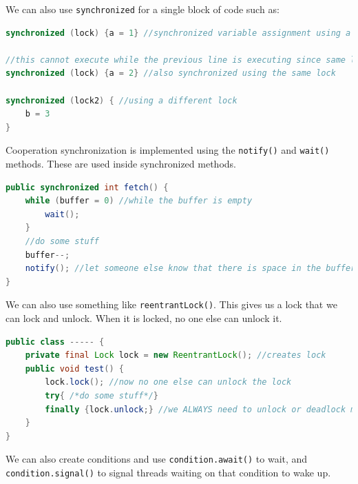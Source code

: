\documentclass[12pt,letterpaper]{article} \usepackage{amsmath} \usepackage{graphicx} \usepackage[margin=1in]{geometry} \usepackage{longtable}  \usepackage{amssymb}
\begin{document}
	We can also use \verb*|synchronized| for a single block of code such as:
	\begin{lstlisting}[language=java]
synchronized (lock) {a = 1} //synchronized variable assignment using a lock

//this cannot execute while the previous line is executing since same lock
synchronized (lock) {a = 2} //also synchronized using the same lock 

synchronized (lock2) { //using a different lock
	b = 3
}
	\end{lstlisting}

	Cooperation synchronization is implemented using the \verb*|notify()| and \verb*|wait()| methods. These are used inside synchronized methods. 
	\begin{lstlisting}[language=java]
public synchronized int fetch() {
	while (buffer = 0) //while the buffer is empty
		wait();
	}
	//do some stuff 
	buffer--;
	notify(); //let someone else know that there is space in the buffer to add to
}
	\end{lstlisting}

	We can also use something like \verb*|reentrantLock()|. This gives us a lock that we can lock and unlock. When it is locked, no one else can unlock it. 
	
	\begin{lstlisting}[language=java]
public class ----- {
	private final Lock lock = new ReentrantLock(); //creates lock
	public void test() {
		lock.lock(); //now no one else can unlock the lock
		try{ /*do some stuff*/}
		finally {lock.unlock;} //we ALWAYS need to unlock or deadlock may occur
	}
}
	\end{lstlisting}

	We can also create conditions and use \verb*|condition.await()| to wait, and \verb*|condition.signal()| to signal threads waiting on that condition to wake up.

	
	
\end{document}
